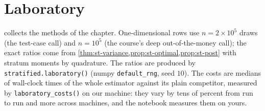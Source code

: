 \section{Laboratory}\label{sec:st-lab}

 collects the methods of the chapter. One-dimensional rows use $n=2\times10^5$
draws (the test-case call) and $n=10^5$ (the course's deep out-of-the-money call); the
exact ratios come from \cref{thm:st-variance,prop:st-optimal,prop:st-post} with stratum
moments by quadrature. The ratios are produced by \texttt{stratified.laboratory()} (numpy
\texttt{default\_rng}, seed $10$). The costs are medians of wall-clock times of the whole
estimator against its plain competitor, measured by \texttt{laboratory\_costs()} on our machine:
they vary by tens of percent from run to run and more across machines, and the notebook
measures them on yours.

